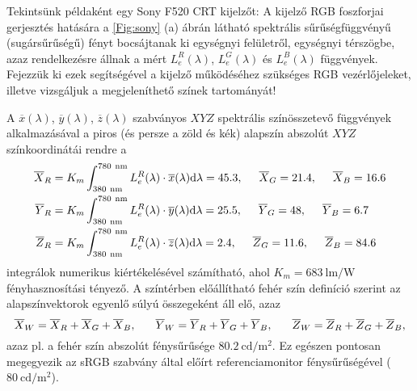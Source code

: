Tekintsünk példaként egy Sony F520 CRT kijelzőt: 
A kijelző RGB foszforjai gerjesztés hatására a \ref{Fig:sony} (a) ábrán látható spektrális sűrűségfüggvényű (sugársűrűségű) fényt bocsájtanak ki egységnyi felületről, egységnyi térszögbe, azaz rendelkezésre állnak a mért $L_{e}^R(\lambda)$, $L_{e}^G(\lambda)$ és $L_{e}^B(\lambda)$ függvények.
Fejezzük ki ezek segítségével a kijelző működéséhez szükséges RGB vezérlőjeleket, illetve vizsgáljuk a megjeleníthető színek tartományát!

A $\overline{x}(\lambda)$, $\overline{y}(\lambda)$, $\overline{z}(\lambda)$ szabványos $XYZ$ spektrális színösszetevő függvények alkalmazásával a piros (és persze a zöld és kék) alapszín abszolút $XYZ$ színkoordinátái rendre a
\begin{align}
\begin{split}
\overline{X}_R &= K_m \int_{380~\mathrm{nm}}^{780~\mathrm{nm}} L_{e}^R(\lambda) \cdot \overline{x}(\lambda) \mathrm{d} \lambda = 45.3, \hspace{5mm} \overline{X}_G = 21.4,\hspace{5mm}  \overline{X}_B = 16.6 \\
\overline{Y}_R &= K_m \int_{380~\mathrm{nm}}^{780~\mathrm{nm}} L_{e}^R(\lambda) \cdot \overline{y}(\lambda) \mathrm{d} \lambda = 25.5
, \hspace{5mm} \overline{Y}_G = 48,\hspace{5mm}  \overline{Y}_B = 6.7 \\
\overline{Z}_R &= K_m \int_{380~\mathrm{nm}}^{780~\mathrm{nm}} L_{e}^R(\lambda) \cdot \overline{z}(\lambda) \mathrm{d} \lambda  = 2.4, \hspace{5mm} \overline{Z}_G = 11.6,\hspace{5mm}  \overline{Z}_B =84.6\\
\end{split}
\end{align}
integrálok numerikus kiértékelésével számítható, ahol $K_m = 683~\mathrm{lm/W}$ fényhasznosítási tényező.
A színtérben előállítható fehér szín definíció szerint az alapszínvektorok egyenlő súlyú összegeként áll elő, azaz
\begin{equation}
\overline{X}_W = \overline{X}_R + \overline{X}_G + \overline{X}_B, \hspace{6mm} 
\overline{Y}_W = \overline{Y}_R + \overline{Y}_G + \overline{Y}_B, \hspace{6mm} 
\overline{Z}_W = \overline{Z}_R + \overline{Z}_G + \overline{Z}_B,
\end{equation}
azaz pl. a fehér szín abszolút fénysűrűsége $80.2~\mathrm{cd/m^2}$.
Ez egészen pontosan megegyezik az sRGB szabvány által előírt referenciamonitor fénysűrűségével ($80~\mathrm{cd/m^2}$).

